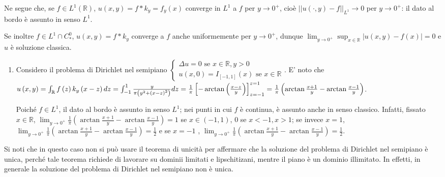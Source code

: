 \documentclass{article}
\begin{document}
Ne segue che, se $f\in L^{1}\left( 
\mathbb{R}
\right) $, $u\left( x,y\right) =f\ast k_{y}=f_{y}\left( x\right) $ converge
in $L^{1}$ a $f$ per $y\rightarrow 0^{+}$, cio\`{e} $\left\vert \left\vert
u\left( \cdot ,y\right) -f\right\vert \right\vert _{L^{1}}\rightarrow 0$ per 
$y\rightarrow 0^{+}$: il dato al bordo \`{e} assunto in senso $L^{1}$.

Se inoltre $f\in L^{1}\cap C_{\ast }^{0}$, $u\left( x,y\right) =f\ast k_{y}$
converge a $f$ anche uniformemente per $y\rightarrow 0^{+}$, dunque $%
\lim_{y\rightarrow 0^{+}}\sup_{x\in 
\mathbb{R}
}\left\vert u\left( x,y\right) -f\left( x\right) \right\vert =0$ e $u$ \`{e}
soluzione classica.

\begin{enumerate}
\item Considero il problema di Dirichlet nel semipiano $\left\{ 
\begin{array}{c}
\Delta u=0\text{ se }x\in 
\mathbb{R}
,y>0 \\ 
u\left( x,0\right) =I_{\left[ -1,1\right] }\left( x\right) \text{ se }x\in 
\mathbb{R}%
\end{array}%
\right. $. E' noto che $u\left( x,y\right) =\int_{%
\mathbb{R}
}f\left( z\right) k_{y}\left( x-z\right) dz=\int_{-1}^{1}\frac{y}{\pi \left(
y^{2}+\left( x-z\right) ^{2}\right) }dz=\frac{1}{\pi }\left[ -\arctan \left( 
\frac{x-z}{y}\right) \right] _{z=-1}^{z=1}=\frac{1}{\pi }\left( \arctan 
\frac{x+1}{y}-\arctan \frac{x-1}{y}\right) $.

Poich\'{e} $f\in L^{1}$, il dato al bordo \`{e} assunto in senso $L^{1}$;
nei punti in cui $f$ \`{e} continua, \`{e} assunto anche in senso classico.
Infatti, fissato $x\in 
\mathbb{R}
$, $\lim_{y\rightarrow 0^{+}}\frac{1}{\pi }\left( \arctan \frac{x+1}{y}%
-\arctan \frac{x-1}{y}\right) =1$ se $x\in \left( -1,1\right) $, $0$ se $%
x<-1,x>1$; se invece $x=1$, $\lim_{y\rightarrow 0^{+}}\frac{1}{\pi }\left(
\arctan \frac{x+1}{y}-\arctan \frac{x-1}{y}\right) =\frac{1}{2}$ e se $x=-1$%
, $\lim_{y\rightarrow 0^{+}}\frac{1}{\pi }\left( \arctan \frac{x+1}{y}%
-\arctan \frac{x-1}{y}\right) =\frac{1}{2}$.
\end{enumerate}

Si noti che in questo caso non si pu\`{o} usare il teorema di unicit\`{a}
per affermare che la soluzione del problema di Dirichlet nel semipiano \`{e}
unica, perch\'{e} tale teorema richiede di lavorare su dominii limitati e
lipschitizani, mentre il piano \`{e} un dominio illimitato. In effetti, in
generale la soluzione del problema di Dirichlet nel semipiano non \`{e}
unica.
\end{document}
